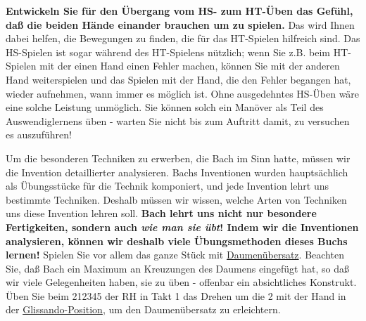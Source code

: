 \textbf{Entwickeln Sie für den Übergang vom HS- zum HT-Üben das Gefühl, daß die beiden Hände einander brauchen um zu spielen.}
Das wird Ihnen dabei helfen, die Bewegungen zu finden, die für das HT-Spielen hilfreich sind.
Das HS-Spielen ist sogar während des HT-Spielens nützlich; wenn Sie z.B. beim HT-Spielen mit der einen Hand einen Fehler machen, können Sie mit der anderen Hand weiterspielen und das Spielen mit der Hand, die den Fehler begangen hat, wieder aufnehmen, wann immer es möglich ist.
Ohne ausgedehntes HS-Üben wäre eine solche Leistung unmöglich.
Sie können solch ein Manöver als Teil des Auswendiglernens üben - warten Sie nicht bis zum Auftritt damit, zu versuchen es auszuführen!

Um die besonderen Techniken zu erwerben, die Bach im Sinn hatte, müssen wir die Invention detaillierter analysieren.
Bachs Inventionen wurden hauptsächlich als Übungsstücke für die Technik komponiert, und jede Invention lehrt uns bestimmte Techniken.
Deshalb müssen wir wissen, welche Arten von Techniken uns diese Invention lehren soll.
\textbf{Bach lehrt uns nicht nur besondere Fertigkeiten, sondern auch \textit{wie man sie übt}! Indem wir die Inventionen analysieren, können wir deshalb viele Übungsmethoden dieses Buchs lernen!}
Spielen Sie vor allem das ganze Stück mit \hyperref[c1iii5b]{Daumenübersatz}.
Beachten Sie, daß Bach ein Maximum an Kreuzungen des Daumens eingefügt hat, so daß wir viele Gelegenheiten haben, sie zu üben - offenbar ein absichtliches Konstrukt.
Üben Sie beim 212345 der RH in Takt 1 das Drehen um die 2 mit der Hand in der \hyperref[c1iii5c]{Glissando-Position}, um den Daumenübersatz zu erleichtern.

